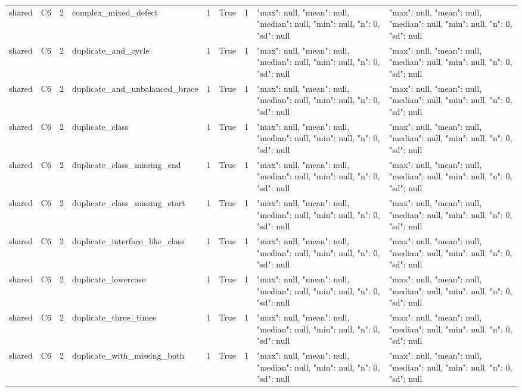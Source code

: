 \begin{tabular}{lllllllll}
shared & C6 & 2 & complex\_mixed\_defect & 1 & True & 1 & {"max": null, "mean": null, "median": null, "min": null, "n": 0, "sd": null} & {"max": null, "mean": null, "median": null, "min": null, "n": 0, "sd": null} \\
shared & C6 & 2 & duplicate\_and\_cycle & 1 & True & 1 & {"max": null, "mean": null, "median": null, "min": null, "n": 0, "sd": null} & {"max": null, "mean": null, "median": null, "min": null, "n": 0, "sd": null} \\
shared & C6 & 2 & duplicate\_and\_unbalanced\_brace & 1 & True & 1 & {"max": null, "mean": null, "median": null, "min": null, "n": 0, "sd": null} & {"max": null, "mean": null, "median": null, "min": null, "n": 0, "sd": null} \\
shared & C6 & 2 & duplicate\_class & 1 & True & 1 & {"max": null, "mean": null, "median": null, "min": null, "n": 0, "sd": null} & {"max": null, "mean": null, "median": null, "min": null, "n": 0, "sd": null} \\
shared & C6 & 2 & duplicate\_class\_missing\_end & 1 & True & 1 & {"max": null, "mean": null, "median": null, "min": null, "n": 0, "sd": null} & {"max": null, "mean": null, "median": null, "min": null, "n": 0, "sd": null} \\
shared & C6 & 2 & duplicate\_class\_missing\_start & 1 & True & 1 & {"max": null, "mean": null, "median": null, "min": null, "n": 0, "sd": null} & {"max": null, "mean": null, "median": null, "min": null, "n": 0, "sd": null} \\
shared & C6 & 2 & duplicate\_interface\_like\_class & 1 & True & 1 & {"max": null, "mean": null, "median": null, "min": null, "n": 0, "sd": null} & {"max": null, "mean": null, "median": null, "min": null, "n": 0, "sd": null} \\
shared & C6 & 2 & duplicate\_lowercase & 1 & True & 1 & {"max": null, "mean": null, "median": null, "min": null, "n": 0, "sd": null} & {"max": null, "mean": null, "median": null, "min": null, "n": 0, "sd": null} \\
shared & C6 & 2 & duplicate\_three\_times & 1 & True & 1 & {"max": null, "mean": null, "median": null, "min": null, "n": 0, "sd": null} & {"max": null, "mean": null, "median": null, "min": null, "n": 0, "sd": null} \\
shared & C6 & 2 & duplicate\_with\_missing\_both & 1 & True & 1 & {"max": null, "mean": null, "median": null, "min": null, "n": 0, "sd": null} & {"max": null, "mean": null, "median": null, "min": null, "n": 0, "sd": null} \\

\end{tabular}
